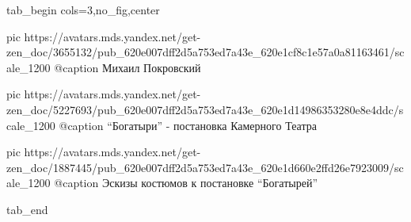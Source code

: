  
 
 
 
 


\ifcmt
  tab_begin cols=3,no_fig,center

     pic https://avatars.mds.yandex.net/get-zen_doc/3655132/pub_620e007dff2d5a753ed7a43e_620e1cf8c1e57a0a81163461/scale_1200
		 @caption Михаил Покровский

		 pic https://avatars.mds.yandex.net/get-zen_doc/5227693/pub_620e007dff2d5a753ed7a43e_620e1d14986353280e8e4ddc/scale_1200
		 @caption \enquote{Богатыри} - постановка Камерного Театра

		 pic https://avatars.mds.yandex.net/get-zen_doc/1887445/pub_620e007dff2d5a753ed7a43e_620e1d660e2ffd26e7923009/scale_1200
		 @caption Эскизы костюмов к постановке \enquote{Богатырей}

  tab_end
\fi
